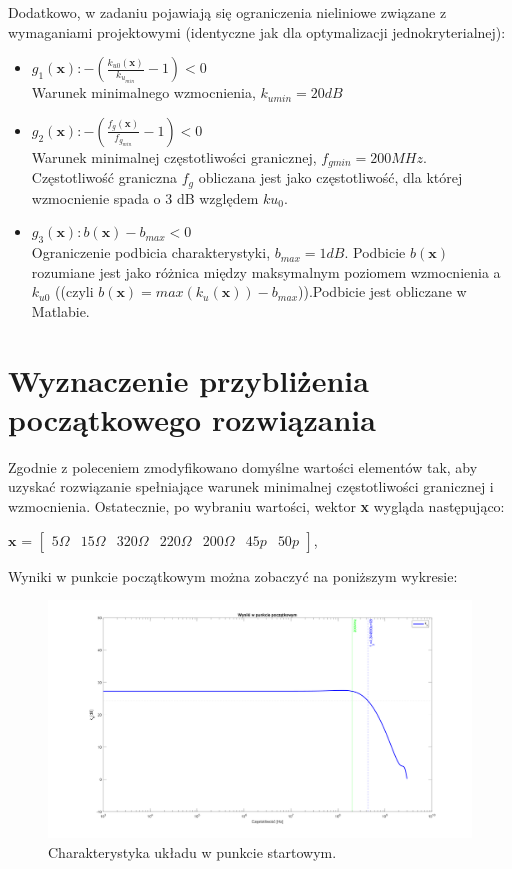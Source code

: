 \documentclass{article}
\begin{document}
Dodatkowo, w zadaniu pojawiają się ograniczenia nieliniowe związane z wymaganiami projektowymi (identyczne jak dla optymalizacji jednokryterialnej):\\
\begin{itemize}
	\item \(g_1(\textbf{x}): -(\frac{k_{u0}(\textbf{x})}{k_{u_{min}}}-1) <  0\) \\ Warunek minimalnego wzmocnienia, $k_{umin}=20dB$
	\item \(g_2(\textbf{x}): -(\frac{{f_g}(\textbf{x})}{f_{g_{min}}}-1)<0\) \\ Warunek minimalnej częstotliwości granicznej, $f_{gmin}=200 MHz$. Częstotliwość graniczna $f_g$ obliczana jest jako częstotliwość,
dla której wzmocnienie spada o 3 dB względem $ku_0$.
	\item \(g_3(\textbf{x}): b(\textbf{x})-b_{max}<0\) \\ Ograniczenie podbicia charakterystyki, $b_{max}=1dB$. Podbicie $b(\textbf{x})$ rozumiane jest jako różnica między maksymalnym poziomem wzmocnienia a $k_{u0}$ ((czyli $b(\textbf{x})=max(k_{u}(\textbf{x}))-b_{max}$)).Podbicie jest obliczane w Matlabie.

\end{itemize}




\section{Wyznaczenie przybliżenia początkowego rozwiązania}
Zgodnie z poleceniem zmodyfikowano domyślne wartości elementów tak, aby uzyskać rozwiązanie spełniające warunek minimalnej częstotliwości granicznej i wzmocnienia.
Ostatecznie, po wybraniu wartości, wektor \textbf{x} wygląda następująco:
\begin{center}
	$\textbf{x}$ =
	$\begin{bmatrix}
			5\Omega & 15\Omega & 320\Omega & 220\Omega & 200\Omega & 45p & 50p
		\end{bmatrix}$,
\end{center}

Wyniki w punkcie początkowym można zobaczyć na poniższym wykresie:

\begin{figure}[h]
	\includegraphics[width=12cm]{graphics/starting_point.png}
	\centering
	\caption{Charakterystyka układu w punkcie startowym.}
\end{figure}
\end{document}
